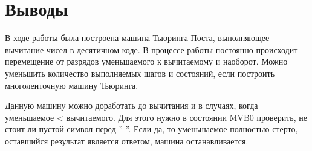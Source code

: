 \section{Выводы}
В ходе работы была построена машина Тьюринга-Поста, выполняющее вычитание чисел в десятичном коде. В процессе работы постоянно происходит перемещение от разрядов уменьшаемого к вычитаемому и наоборот. Можно уменьшить количество выполняемых шагов и состояний, если построить многоленточную машину Тьюринга.

Данную машину можно доработать до вычитания и в случаях, когда уменьшаемое < вычитаемого. Для этого нужно в состоянии MVB0 проверить, не стоит ли пустой символ перед ''-''. Если да, то уменьшаемое полностью стерто, оставшийся результат является ответом, машина останавливается.

